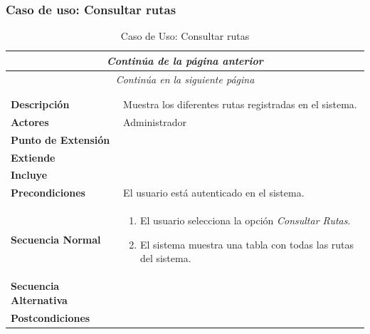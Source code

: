 


\newpage
\subsubsection*{Caso de uso: Consultar rutas }
\begin{longtable}{| p{4cm} | p{10cm} |}
\endfirsthead
\multicolumn{2}{c}{\textit{Continúa de la página anterior}}\\[12pt]
\hline
\endhead
\hline
\multicolumn{2}{c}{\textit{Continúa en la siguiente página}} \\
\endfoot
\hline
\caption{Caso de Uso: Consultar rutas}\label{fig:1}\\
\endlastfoot


\hline
\multicolumn{2}{|c|}{\textbf{CU$<$27$>$ - Consultar Rutas}} \\

\hline
\textbf{Descripción} &
Muestra los diferentes rutas registradas en el sistema.\\

\hline
\textbf{Actores} &
Administrador\\

\hline
\textbf{Punto de Extensión} &
\\

\hline
\textbf{Extiende} &
\\

\hline
\textbf{Incluye} &
\\

\hline
\textbf{Precondiciones} &
El usuario está autenticado en el sistema.\\

\hline
\textbf{Secuencia Normal} &\mbox{}\par\vspace{-\baselineskip}
\begin{enumerate}[leftmargin=0.7cm, topsep=0.1cm]
\item El usuario selecciona la opción \textit{Consultar Rutas}.
\item El sistema muestra una tabla con todas las rutas del sistema.
\end{enumerate}


\\
\hline
\textbf{Secuencia Alternativa} &\mbox{}\par\vspace{-\baselineskip}
\\

\hline
\textbf{Postcondiciones} & \\
\hline
\end{longtable}




